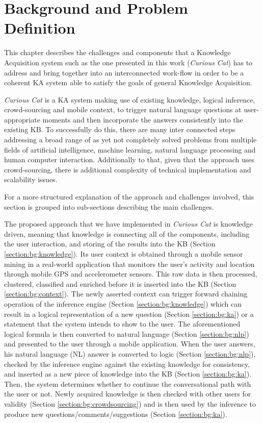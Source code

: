 %
\chapter{Background and Problem Definition}
\label{chapter:background}
This chapter describes the challenges and components that a Knowledge
Acquisition system such as the one presented in this work (\emph{Curious Cat})
has to address and 
bring together into an interconnected work-flow in order to be a coherent 
KA system able to satisfy the goals of general Knowledge Acquisition. 

\emph{Curious Cat} is a KA system making use of existing knowledge, 
logical inference, crowd-sourcing and mobile context, to trigger natural language
questions at user-appropriate moments and then incorporate the answers consistently
into the existing KB. To successfully do this, there are many inter connected
steps addressing a broad range of as yet not completely solved problems from
multiple fields of artificial intelligence, machine learning, natural language
processing and human computer interaction. Additionally to that, given
that the approach uses crowd-sourcing, there is additional complexity
of technical implementation and scalability issues. 

For a more structured explanation of the approach and challenges involved, this
section is grouped into sub-sections describing the main challenges.

The proposed approach that we have implemented in \emph{Curious Cat} is
knowledge driven, meaning that knowledge is connecting
all of the components, including the user interaction, and storing of the
results into the KB (Section \ref{section:bg:knowledge}). Its user context is 
obtained through a mobile sensor mining in a real-world application that 
monitors the user’s activity and location through mobile GPS and accelerometer 
sensors. This raw data is then processed, clustered, classified and enriched 
before it is inserted into the KB (Section \ref{section:bg:context}).
The newly asserted context can trigger forward chaining operation of the 
inference engine (Section \ref{section:bg:knowledge}) which can result in a
logical representation of a new question (Section \ref{section:bg:ka}) or a 
statement that the system intends to show to the user. The aforementioned  
logical formula is then converted to natural language (Section 
\ref{section:bg:nlp}) and presented to the user through a mobile application. 
When the user answers, his natural language (NL) answer is converted to logic 
(Section \ref{section:bg:nlp}), checked by the inference engine against the 
existing knowledge for consistency, and inserted as a new piece of knowledge into 
the KB (Section \ref{section:bg:ka}). Then, the system determines whether to
continue the conversational path with the user or not. Newly acquired knowledge 
is then checked with other users for
validity (Section \ref{section:bg:crowdsourcing}) and is then used by the 
inference to produce new questions/comments/suggestions (Section 
\ref{section:bg:ka}).

